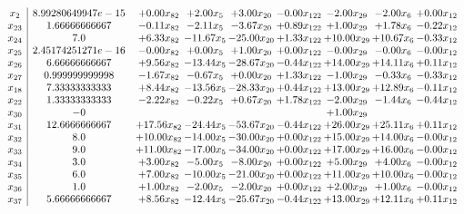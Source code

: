 \documentclass[8pt]{article}
\begin{document}
\[\begin{array}{c| c c@{\hskip 2pt} c@{\hskip 2pt} c@{\hskip 2pt} c@{\hskip 2pt} c@{\hskip 2pt} c@{\hskip 2pt} c@{\hskip 2pt} }
 x_{2}   &  8.99280649947e-15 & +  0.00 x_{82} & +  2.00 x_{5} & +  3.00 x_{20} & -0.00 x_{122} & -2.00 x_{29} & -2.00 x_{6} & +  0.00 x_{12}\\
 x_{23}   &  1.66666666667 & -0.11 x_{82} & -2.11 x_{5} & -3.67 x_{20} & +  0.89 x_{122} & +  1.00 x_{29} & +  1.78 x_{6} & -0.22 x_{12}\\
 x_{24}   &  7.0 & +  6.33 x_{82} & -11.67 x_{5} & -25.00 x_{20} & +  1.33 x_{122} & + 10.00 x_{29} & + 10.67 x_{6} & -0.33 x_{12}\\
 x_{25}   &  2.45174251271e-16 & -0.00 x_{82} & +  0.00 x_{5} & +  1.00 x_{20} & +  0.00 x_{122} & -0.00 x_{29} & -0.00 x_{6} & -0.00 x_{12}\\
 x_{26}   &  6.66666666667 & +  9.56 x_{82} & -13.44 x_{5} & -28.67 x_{20} & -0.44 x_{122} & + 14.00 x_{29} & + 14.11 x_{6} & +  0.11 x_{12}\\
 x_{27}   &  0.999999999998 & -1.67 x_{82} & -0.67 x_{5} & +  0.00 x_{20} & +  1.33 x_{122} & -1.00 x_{29} & -0.33 x_{6} & -0.33 x_{12}\\
 x_{18}   &  7.33333333333 & +  8.44 x_{82} & -13.56 x_{5} & -28.33 x_{20} & +  0.44 x_{122} & + 13.00 x_{29} & + 12.89 x_{6} & -0.11 x_{12}\\
 x_{22}   &  1.33333333333 & -2.22 x_{82} & -0.22 x_{5} & +  0.67 x_{20} & +  1.78 x_{122} & -2.00 x_{29} & -1.44 x_{6} & -0.44 x_{12}\\
 x_{30}   &  -0  &    &    &    &   & +  1.00 x_{29} &    &   \\
 x_{31}   &  12.6666666667 & + 17.56 x_{82} & -24.44 x_{5} & -53.67 x_{20} & -0.44 x_{122} & + 26.00 x_{29} & + 25.11 x_{6} & +  0.11 x_{12}\\
 x_{32}   &  8.0 & + 10.00 x_{82} & -14.00 x_{5} & -30.00 x_{20} & +  0.00 x_{122} & + 15.00 x_{29} & + 14.00 x_{6} & -0.00 x_{12}\\
 x_{33}   &  9.0 & + 11.00 x_{82} & -17.00 x_{5} & -34.00 x_{20} & +  0.00 x_{122} & + 17.00 x_{29} & + 16.00 x_{6} & -0.00 x_{12}\\
 x_{34}   &  3.0 & +  3.00 x_{82} & -5.00 x_{5} & -8.00 x_{20} & +  0.00 x_{122} & +  5.00 x_{29} & +  4.00 x_{6} & -0.00 x_{12}\\
 x_{35}   &  6.0 & +  7.00 x_{82} & -10.00 x_{5} & -21.00 x_{20} & +  0.00 x_{122} & + 11.00 x_{29} & + 10.00 x_{6} & -0.00 x_{12}\\
 x_{36}   &  1.0 & +  1.00 x_{82} & -2.00 x_{5} & -2.00 x_{20} & +  0.00 x_{122} & +  2.00 x_{29} & +  1.00 x_{6} & -0.00 x_{12}\\
 x_{37}   &  5.66666666667 & +  8.56 x_{82} & -12.44 x_{5} & -25.67 x_{20} & -0.44 x_{122} & + 13.00 x_{29} & + 12.11 x_{6} & +  0.11 x_{12}\\

\end{array}\]
\end{document}
